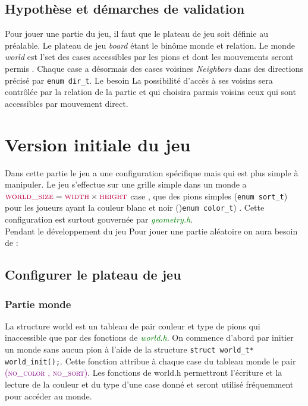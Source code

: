 \documentclass[a4paper]{article}
\begin{document}
\subsection{Hypothèse et démarches de validation}
Pour jouer une partie du jeu, il faut que le plateau de jeu soit définie au préalable. Le plateau de jeu \textit{board}  étant le binôme monde et relation. 
Le monde \textit{world} est l’set des cases accessibles par les pions et dont les mouvements seront permis . Chaque case a désormais des cases voisines \textit{Neighbors} dans des directions précisé par \lstinline|enum dir_t|.
Le besoin 
La possibilité d’accès à ses voisins sera contrôlée par la relation de la partie et qui choisira parmis voisins ceux qui sont accessibles par mouvement direct.  
\section{Version initiale du jeu}
Dans cette partie le jeu a une configuration spécifique mais qui est plus simple à manipuler. Le jeu s’effectue sur une grille simple dans un monde a $\textcolor{purple}{\textsc{world\_size}} = \textcolor{purple}{\textsc{width}} \times \textcolor{purple}{\textsc{height}}$  case , que des pions simples (\lstinline|enum sort_t|) pour les joueurs ayant la couleur blanc et noir ()\lstinline|enum color_t|) . Cette configuration est surtout gouvernée par \textcolor{green}{\textit{geometry.h}}. \\
Pendant le développement du jeu 
Pour jouer une partie aléatoire on aura besoin de :
\subsection{Configurer le plateau de jeu}
\subsubsection{Partie monde}
La structure world est un tableau de pair couleur et type de pions qui inaccessible que par des fonctions de \textcolor{green}{\textit{world.h}}. On commence d’abord par initier un monde sans aucun pion à l’aide de la structure \lstinline|struct world_t* world_init();|. Cette fonction attribue à chaque case du tableau monde le pair \textcolor{purple}{\textsc{(no\_color , no\_sort)}}. Les fonctions de world.h permettront l’écriture et la lecture de la couleur et du type d’une case donné et seront utilisé fréquemment pour accéder au monde.  
\end{document}
